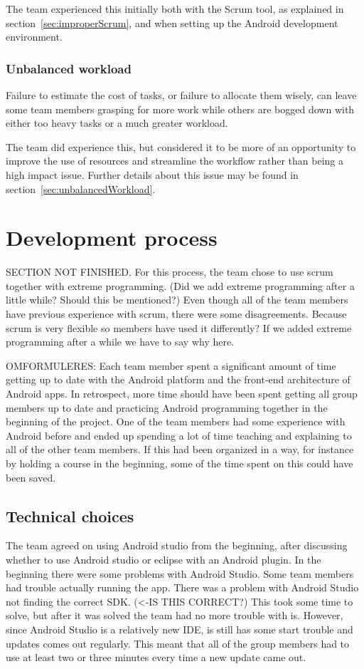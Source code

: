 The team experienced this initially both with the Scrum tool, as explained in section~\ref{sec:improperScrum}, and when setting up the Android development environment.

\subsubsection{Unbalanced workload}
Failure to estimate the cost of tasks, or failure to allocate them wisely, can leave some team members grasping for more work while others are bogged down with either too heavy tasks or a much greater workload.

The team did experience this, but considered it to be more of an opportunity to improve the use of resources and streamline the workflow rather than being a high impact issue. Further details about this issue may be found in section~\ref{sec:unbalancedWorkload}.


\section{Development process}
SECTION NOT FINISHED. For this process, the team chose to use scrum together with extreme programming. (Did we add extreme programming after a little while? Should this be mentioned?) Even though all of the team members have previous experience with scrum, there were some disagreements. Because scrum is very flexible so members have used it differently? If we added extreme programming after a while we have to say why here. 

OMFORMULERES: Each team member spent a significant amount of time getting up to date with the Android platform and the front-end architecture of Android apps. In retrospect, more time should have been spent getting all group members up to date and practicing Android programming together in the beginning of the project. One of the team members had some experience with Android before and ended up spending a lot of time teaching and explaining to all of the other team members. If this had been organized in a way, for instance by holding a course in the beginning, some of the time spent on this could have been saved. 

\subsection{Technical choices}
The team agreed on using Android studio from the beginning, after discussing whether to use Android studio or eclipse with an Android plugin. In the beginning there were some problems with Android Studio. Some team members had trouble actually running the app. There was a problem with Android Studio not finding the correct SDK. (<-IS THIS CORRECT?) This took some time to solve, but after it was solved the team had no more trouble with is. However, since Android Studio is a relatively new IDE, is still has some start trouble and updates comes out regularly. This meant that all of the group members had to use at least two or three minutes every time a new update came out. 


